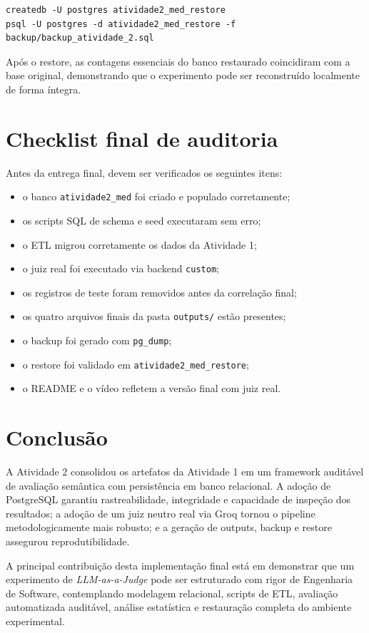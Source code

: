 \documentclass[12pt,a4paper]{article}
\begin{document}
\begin{lstlisting}[caption={Restore do experimento em banco separado}]
createdb -U postgres atividade2_med_restore
psql -U postgres -d atividade2_med_restore -f backup/backup_atividade_2.sql
\end{lstlisting}

Após o restore, as contagens essenciais do banco restaurado coincidiram com a base original, demonstrando que o experimento pode ser reconstruído localmente de forma íntegra.

\section{Checklist final de auditoria}

Antes da entrega final, devem ser verificados os seguintes itens:

\begin{itemize}[leftmargin=1.2cm]
    \item o banco \texttt{atividade2\_med} foi criado e populado corretamente;
    \item os scripts SQL de schema e seed executaram sem erro;
    \item o ETL migrou corretamente os dados da Atividade 1;
    \item o juiz real foi executado via backend \texttt{custom};
    \item os registros de teste foram removidos antes da correlação final;
    \item os quatro arquivos finais da pasta \texttt{outputs/} estão presentes;
    \item o backup foi gerado com \texttt{pg\_dump};
    \item o restore foi validado em \texttt{atividade2\_med\_restore};
    \item o README e o vídeo refletem a versão final com juiz real.
\end{itemize}

\section{Conclusão}

A Atividade 2 consolidou os artefatos da Atividade 1 em um framework auditável de avaliação semântica com persistência em banco relacional. A adoção de PostgreSQL garantiu rastreabilidade, integridade e capacidade de inspeção dos resultados; a adoção de um juiz neutro real via Groq tornou o pipeline metodologicamente mais robusto; e a geração de outputs, backup e restore assegurou reprodutibilidade.

A principal contribuição desta implementação final está em demonstrar que um experimento de \textit{LLM-as-a-Judge} pode ser estruturado com rigor de Engenharia de Software, contemplando modelagem relacional, scripts de ETL, avaliação automatizada auditável, análise estatística e restauração completa do ambiente experimental.
\end{document}
